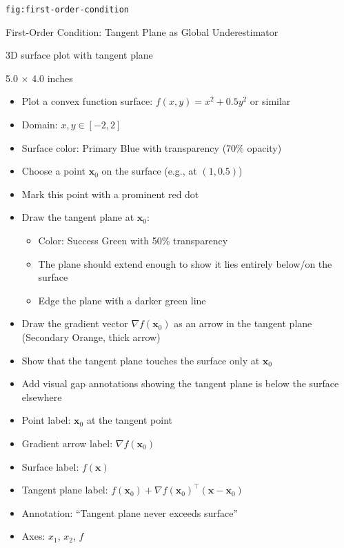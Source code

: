 \documentclass[12pt]{article}
\begin{document}
\begin{description}[style=nextline, leftmargin=0pt]
    \item[Figure ID] \texttt{fig:first-order-condition}
    \item[Title] First-Order Condition: Tangent Plane as Global Underestimator
    \item[Type] 3D surface plot with tangent plane
    \item[Size] 5.0 $\times$ 4.0 inches

    \item[Visual Description]
    \begin{itemize}
        \item Plot a convex function surface: $f(x, y) = x^2 + 0.5y^2$ or similar
        \item Domain: $x, y \in [-2, 2]$
        \item Surface color: Primary Blue with transparency (70\% opacity)
        \item Choose a point $\mathbf{x}_0$ on the surface (e.g., at $(1, 0.5)$)
        \item Mark this point with a prominent red dot
        \item Draw the tangent plane at $\mathbf{x}_0$:
        \begin{itemize}
            \item Color: Success Green with 50\% transparency
            \item The plane should extend enough to show it lies entirely below/on the surface
            \item Edge the plane with a darker green line
        \end{itemize}
        \item Draw the gradient vector $\nabla f(\mathbf{x}_0)$ as an arrow in the tangent plane (Secondary Orange, thick arrow)
        \item Show that the tangent plane touches the surface only at $\mathbf{x}_0$
        \item Add visual gap annotations showing the tangent plane is below the surface elsewhere
    \end{itemize}

    \item[Required Labels]
    \begin{itemize}
        \item Point label: $\mathbf{x}_0$ at the tangent point
        \item Gradient arrow label: $\nabla f(\mathbf{x}_0)$
        \item Surface label: $f(\mathbf{x})$
        \item Tangent plane label: $f(\mathbf{x}_0) + \nabla f(\mathbf{x}_0)^\top (\mathbf{x} - \mathbf{x}_0)$
        \item Annotation: ``Tangent plane never exceeds surface''
        \item Axes: $x_1$, $x_2$, $f$
    \end{itemize}


\end{description}
\end{document}
